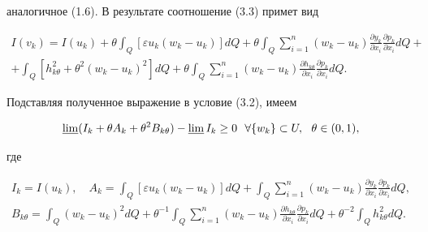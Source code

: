 \begin{pf}
аналогичное (1.6). В результате соотношение (3.3) примет вид


\begin{multline*} 


I(v_k)=I(u_k)+\theta\int_Q[\varepsilon u_k(w_k-u_k)]d Q+ 


\theta\int_Q\sum^n_{i=1}(w_k-u_k) 


\frac{\partial y_k}{\partial x_i} 


\frac{\partial p_k}{\partial x_i}d Q+ \\ 


% 


+\int_Q[h^2_{k\theta}+\theta^2(w_k-u_k)^2]d Q+\theta 


\int_Q\sum^n_{i=1}(w_k-u_k) 


\frac{\partial h_{k\theta}}{\partial x_i} 


\frac{\partial p_k}{\partial x_i}d Q. 


\end{multline*} 


 


Подставляя полученное выражение в условие (3.2), имеем 


\begin{equation} 


\varliminf(I_k+\theta A_k+\theta^2B_{k\theta}) 


-\varliminf I_k\ge0\ \ \forall\{w_k\}\subset U, 


\ \ \theta\in(0,1),


\end{equation} 


где 


\begin{gather*} 


I_k=I(u_k),\quad A_k=\int_Q[\varepsilon u_k 


(w_k-u_k)]d Q+\int_Q\sum^n_{i=1}(w_k-u_k) 


\frac{\partial y_k}{\partial x_i} 


\frac{\partial p_k}{\partial x_i}d Q, \\ 


% 


B_{k\theta}=\int_Q(w_k-u_k)^2d Q+\theta^{-1}\int_Q 


\sum^n_{i=1}(w_k-u_k) 


\frac{\partial h_{k\theta}}{\partial x_i} 


\frac{\partial p_k}{\partial x_i}d Q+\theta^{-2} 


\int_Q h^2_{k\theta}d Q. 



\end{gather*}
\end{pf}

